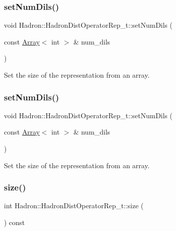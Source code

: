 \subsubsection{\texorpdfstring{setNumDils()}{setNumDils()}\hspace{0.1cm}{\footnotesize\ttfamily [5/6]}}
{\footnotesize\ttfamily void Hadron\+::\+Hadron\+Dist\+Operator\+Rep\+\_\+t\+::set\+Num\+Dils (\begin{DoxyParamCaption}\item[{const \mbox{\hyperlink{classXMLArray_1_1Array}{Array}}$<$ int $>$ \&}]{num\+\_\+dils }\end{DoxyParamCaption})}



Set the size of the representation from an array. 

\mbox{\label{classHadron_1_1HadronDistOperatorRep__t_ae1052d3d087b32a01f02eda6e802d196}} 
\subsubsection{\texorpdfstring{setNumDils()}{setNumDils()}\hspace{0.1cm}{\footnotesize\ttfamily [6/6]}}
{\footnotesize\ttfamily void Hadron\+::\+Hadron\+Dist\+Operator\+Rep\+\_\+t\+::set\+Num\+Dils (\begin{DoxyParamCaption}\item[{const \mbox{\hyperlink{classXMLArray_1_1Array}{Array}}$<$ int $>$ \&}]{num\+\_\+dils }\end{DoxyParamCaption})}



Set the size of the representation from an array. 

\mbox{\label{classHadron_1_1HadronDistOperatorRep__t_aa29061d2a7319319dd6ea0a918acd8db}} 
\subsubsection{\texorpdfstring{size()}{size()}\hspace{0.1cm}{\footnotesize\ttfamily [1/2]}}
{\footnotesize\ttfamily int Hadron\+::\+Hadron\+Dist\+Operator\+Rep\+\_\+t\+::size (\begin{DoxyParamCaption}{ }\end{DoxyParamCaption}) const}



